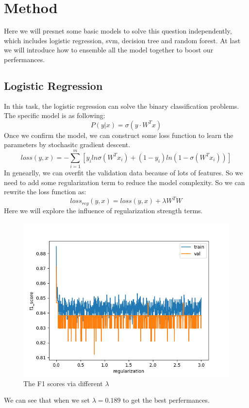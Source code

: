 
\section{Method}
Here we will presnet some basic models to solve this question independently, which includes logistic regression, svm, decision tree and random forest. At last we will introduce how to ensemble all the model together to boost our perfermances.
\subsection{Logistic Regression}
In this task, the logistic regression can solve the binary classification problems. The specific model is as following:
\begin{equation}
    P(y|x) = \sigma(y\cdot W^Tx)
\end{equation}
Once we confirm the model, we can construct some loss function to learn the parameters by stochasitc gradient descent.
\begin{equation}
    loss(y, x) = -\sum_{i=1}^{m} [y_i ln\sigma(W^Tx_i)+(1-y_i)ln(1-\sigma(W^Tx_i))]
\end{equation}
In genearlly, we can overfit the validation data because of lots of features. So we need to add some regularization term to reduce the model complexity.
So we can rewrite the loss function as:
\begin{equation}
    loss_{reg}(y,x) = loss(y, x) + \lambda W^TW
\end{equation}
Here we will explore the influence of regularization strength terms. 
\begin{figure}[ht]
    \centering
    \includegraphics[width=1\linewidth]{img/f1_score_bs1_lg_smote.png}
    \caption{The F1 scores via different $\lambda$}
\end{figure}
We can see that when we set $\lambda=0.189$ to get the best perfermances.

